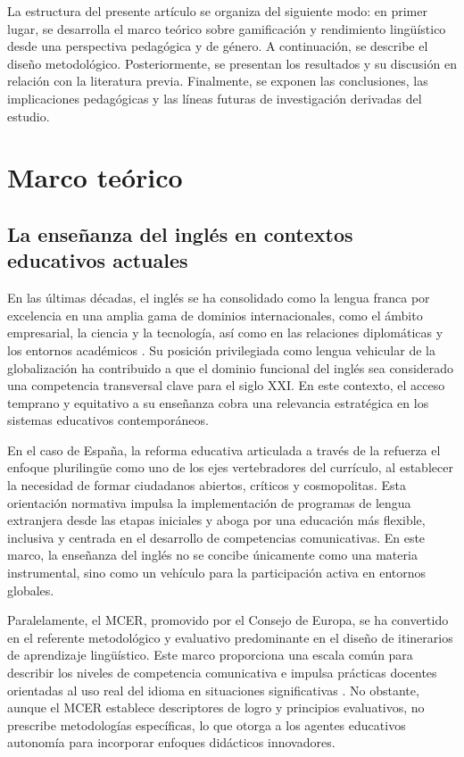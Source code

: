 \documentclass[spanish]{textolivre}
\begin{document}
La estructura del presente artículo se organiza del siguiente modo: en primer lugar, se desarrolla el marco teórico sobre gamificación y rendimiento lingüístico desde una perspectiva pedagógica y de género. A continuación, se describe el diseño metodológico. Posteriormente, se presentan los resultados y su discusión en relación con la literatura previa. Finalmente, se exponen las conclusiones, las implicaciones pedagógicas y las líneas futuras de investigación derivadas del estudio.

\section{Marco teórico}

\subsection{La enseñanza del inglés en contextos educativos actuales}
En las últimas décadas, el inglés se ha consolidado como la lengua franca por excelencia en una amplia gama de dominios internacionales, como el ámbito empresarial, la ciencia y la tecnología, así como en las relaciones diplomáticas y los entornos académicos \cite{arrieta2023}. Su posición privilegiada como lengua vehicular de la globalización ha contribuido a que el dominio funcional del inglés sea considerado una competencia transversal clave para el siglo XXI. En este contexto, el acceso temprano y equitativo a su enseñanza cobra una relevancia estratégica en los sistemas educativos contemporáneos.

En el caso de España, la reforma educativa articulada a través de la \textcite{espana2020} refuerza el enfoque plurilingüe como uno de los ejes vertebradores del currículo, al establecer la necesidad de formar ciudadanos abiertos, críticos y cosmopolitas. Esta orientación normativa impulsa la implementación de programas de lengua extranjera desde las etapas iniciales y aboga por una educación más flexible, inclusiva y centrada en el desarrollo de competencias comunicativas. En este marco, la enseñanza del inglés no se concibe únicamente como una materia instrumental, sino como un vehículo para la participación activa en entornos globales.

Paralelamente, el MCER, promovido por el Consejo de Europa, se ha convertido en el referente metodológico y evaluativo predominante en el diseño de itinerarios de aprendizaje lingüístico. Este marco proporciona una escala común para describir los niveles de competencia comunicativa e impulsa prácticas docentes orientadas al uso real del idioma en situaciones significativas \cite{gomez2020}. No obstante, aunque el MCER establece descriptores de logro y principios evaluativos, no prescribe metodologías específicas, lo que otorga a los agentes educativos autonomía para incorporar enfoques didácticos innovadores.
\end{document}
